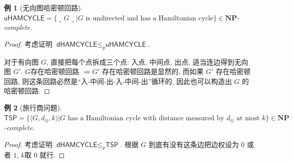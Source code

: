 \documentclass[8pt]{article}
\theoremstyle{compact}
\newtheorem{example}{例}[section]
\def\le{\leqslant}
\def\rep#1{\llcorner{#1}\lrcorner}
\def\NP{\textbf{NP}}
\begin{document}
\begin{example}[无向图哈密顿回路]
	$\textsf{uHAMCYCLE} = \{\rep{G} | G \text{ is undirected and has a Hamiltonian cycle}\} \in \NP$-complete.
\end{example}
\begin{proof}
	考虑证明 $\textsf{dHAMCYCLE} \le_p \textsf{uHAMCYCLE}$.

	对于有向图 $G$, 直接把每个点拆成三个点: 入点, 中间点, 出点, 适当连边得到无向图 $G'$. $G$存在哈密顿回路 $\Rightarrow G'$ 存在哈密顿回路是显然的, 而如果 $G'$ 存在哈密顿回路, 则这条回路必然是“入-中间-出-入-中间-出”循环的, 因此也可以构造出 $G$ 的哈密顿回路.
\end{proof}
\begin{example}[旅行商问题]
	$\textsf{TSP} = \{\langle G, d_{ij}, k \rangle | G \text{ has a Hamiltonian cycle with distance measured by } d_{ij} \text{ at most }k\} \in \NP$-complete.
\end{example}
\begin{proof}
	考虑证明 $\textsf{dHAMCYCLE} \le_p \textsf{TSP}$. 根据 $G$ 到底有没有这条边把边权设为 $0$ 或者 $1$, $k$取 $0$ 就行.
\end{proof}
\end{document}
